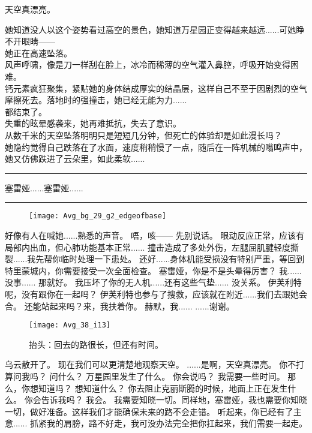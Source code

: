 \documentclass[openany]{book}
\begin{document}
\begin{dialogue}
     天空真漂亮。\par
    她知道没人以这个姿势看过高空的景色，她知道万星园正变得越来越远......可她睁不开眼睛——\\
    她正在高速坠落。\\
    风声呼啸，像是刀一样刮在脸上，冰冷而稀薄的空气灌入鼻腔，呼吸开始变得困难。\\
    钙元素疯狂聚集，紧贴她的身体结成厚实的结晶层，这样自己不至于因剧烈的空气摩擦死去。落地时的强撞击，她已经无能为力......\\
    都结束了。\\
    失重的眩晕感袭来，她再难抵抗，失去了意识。\\
    从数千米的天空坠落明明只是短短几分钟，但死亡的体验却是如此漫长吗？\\
    她隐约觉得自己跌落在了水面，速度稍稍慢了一点，随后在一阵机械的嗡鸣声中，她又仿佛跌进了云朵里，如此柔软......
    \par\noindent\rule{\textwidth}{0.4pt}
    塞雷娅......塞雷娅......
    \par\noindent\rule{\textwidth}{0.4pt}\par
    \begin{figure}[h]
        \centering
        \texttt{[image: Avg\_bg\_29\_g2\_edgeofbase]}
    \end{figure}
    好像有人在喊她......熟悉的声音。
     唔，咳——
     先别说话。
     眼动反应正常，应该有局部内出血，但心肺功能基本正常......
     撞击造成了多处外伤，左腿屈肌腱轻度撕裂......我先帮你临时处理一下患处。
     还好......身体机能受损没有特别严重，等回到特里蒙城内，你需要接受一次全面检查。
     塞雷娅，你是不是头晕得厉害？
     我......没事......
     那就好。
     我压坏了你的无人机......还有这些气垫......
     没关系。
     伊芙利特呢，没有跟你在一起吗？
     伊芙利特也参与了搜救，应该就在附近......我们去跟她会合。
     还能站起来吗？来，我扶着你。
     赫默，我......
     ......谢谢。
    \begin{figure}[h]
        \caption*{抬头：回去的路很长，但还有时间。}
        \centering
        \texttt{[image: Avg\_38\_i13]}
    \end{figure}
     乌云散开了。
     现在我们可以更清楚地观察天空。
     ......是啊，天空真漂亮。
     你不打算问我吗？
     问什么？
     万星园里发生了什么。
     你会说吗？
     我需要一些时间。
     那么，你想知道吗？
     想知道什么？
     你去阻止克丽斯腾的时候，地面上正在发生什么。
     你会告诉我吗？
     我会。
     我需要知晓一切。同样地，塞雷娅，我也需要你知晓一切，做好准备。这样我们才能确保未来的路不会走错。
     听起来，你已经有了主意......
     抓紧我的肩膀，路不好走，我可没办法完全把你扛起来，我们需要一起走。
\end{dialogue}
\end{document}
